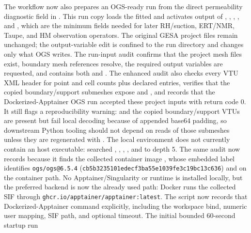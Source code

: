 The workflow now also prepares an OGS-ready run from the direct permeability diagnostic
field in .  This run copy
loads the fitted  and activates output of
, , , , and
, which are the minimum fields needed for later RH/suction, ERT/NMR,
Taupe, and HM observation operators.  The original GESA project files remain
unchanged; the output-variable edit is confined to the run directory and changes only
what OGS writes.  The run-input audit
 confirms that the project
mesh files exist, boundary mesh references resolve, the required output variables are
requested, and  contains both  and
.  The enhanced audit also checks every VTU XML header for point and cell
counts plus declared  entries, verifies that the copied
boundary/support submeshes expose  and ,
and records that the Dockerized-Apptainer OGS run accepted these project inputs with
return code 0.  It still flags a reproducibility warning:  and the
copied boundary/support VTUs are present but fail local  decoding because
of appended base64 padding, so downstream Python tooling should not depend on
 reads of those submeshes unless they are regenerated with
.  The local environment does not currently contain an 
host executable:  searched , ,
, , and  to depth 5.  The same
audit now records  because it finds the collected
container image
,
whose embedded label identifies \texttt{ogs/ogs@6.5.4}
(\texttt{cb5b3235101edecf3ba55e1039fe3c19bc13c636}) and
 on the container path.  No Apptainer/Singularity or
 runtime is installed locally, but the preferred backend is now
the already used  path: Docker runs the collected SIF
through \texttt{ghcr.io/apptainer/apptainer:latest}.  The script
 now records that
Dockerized-Apptainer command explicitly, including the workspace bind, numeric user
mapping, SIF path, and optional timeout.  The initial bounded 60-second startup run
